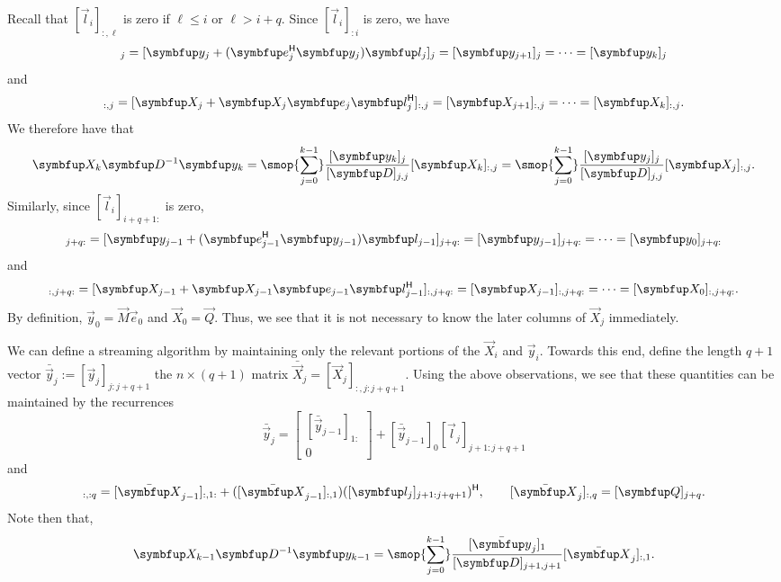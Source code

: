 Recall that $[\vec{l}_i]_{:,\ell}$ is zero if $\ell \leq i$ or $\ell > i +q$.
Since $[\vec{l}_i]_{:i}$ is zero, we have
\begin{equation*}
    [\vec{y}_j]_j
    = [\vec{y}_{j} +  (\vec{e}_{j}^\cT \vec{y}_{j}) \vec{l}_j]_j
    = [\vec{y}_{j+1}]_j
    =\cdots
    = [\vec{y}_{k}]_j
\end{equation*}
and
\begin{equation*}
    [\vec{X}_{j}]_{:,j}
    = [\vec{X}_{j} + \vec{X}_{j} \vec{e}_j \vec{l}_j^\cT]_{:,j}
    = [\vec{X}_{j+1}]_{:,j}
    = \cdots = [\vec{X}_{k}]_{:,j}.
\end{equation*}
We therefore have that
\begin{equation*}
    \vec{X}_{k} \vec{D}^{-1} \vec{y}_{k}
    = \smop{\sum_{j=0}^{k-1}} \frac{[\vec{y}_{k}]_j}{[\vec{D}]_{j,j}} [\vec{X}_{k}]_{:,j}
    = \smop{\sum_{j=0}^{k-1}} \frac{[\vec{y}_{j}]_j}{[\vec{D}]_{j,j}} [\vec{X}_{j}]_{:,j}.
\end{equation*}
Similarly, since $[\vec{l}_i]_{i+q+1:}$ is zero,
\begin{equation*}
    [\vec{y}_j]_{j+q:}
    = [\vec{y}_{j-1} + (\vec{e}_{j-1}^\cT\vec{y}_{j-1}) \vec{l}_{j-1}]_{j+q:}
    = [\vec{y}_{j-1}]_{j+q:}
    = \cdots
    = [\vec{y}_0]_{j+q:}
\end{equation*}
and
\begin{equation*}
    [\vec{X}_{j}]_{:,j+q:}
    = [\vec{X}_{j-1}+\vec{X}_{j-1}\vec{e}_{j-1}\vec{l}_{j-1}^\cT]_{:,j+q:}
    = [\vec{X}_{j-1}]_{:,j+q:}
    =\cdots
    = [\vec{X}_{0}]_{:,j+q:}.
\end{equation*}
By definition, $\vec{y}_0 = \vec{M}\vec{e}_0$ and $\vec{X}_0 = \vec{Q}$.
Thus, we see that it is not necessary to know the later columns of $\vec{X}_j$ immediately. 

We can define a streaming algorithm by maintaining only the relevant portions of the $\vec{X}_i$ and $\vec{y}_i$.
Towards this end, define the length \( q+1 \) vector \( \bar{\vec{y}}_j := [\vec{y}_j]_{j:j+q+1} \) the \( n\times (q+1) \) matrix \( \bar{\vec{X}}_j = [\vec{X}_j]_{:,j:j+q+1} \).
Using the above observations, we see that these quantities can be maintained by the recurrences
\begin{equation*}
    \bar{\vec{y}}_j =  
    \begin{bmatrix}
        [\bar{\vec{y}}_{j-1}]_{1:}\\0
    \end{bmatrix}
    +  [\bar{\vec{y}}_{j-1}]_0 [\vec{l}_j]_{j+1:j+q+1} 
\end{equation*}
and
\begin{equation*}
    [\bar{\vec{X}}_j]_{:,:q}
    = [\bar{\vec{X}}_{j-1}]_{:,1:} 
        + ( [\bar{\vec{X}}_{j-1}]_{:,1} ) ([\vec{l}_j]_{j+1:j+q+1})^\cT
    ,\qquad
    [\bar{\vec{X}}_j]_{:,q} = [\vec{Q}]_{j+q}.
\end{equation*}
Note then that,
\begin{equation*}
    \vec{X}_{k-1} \vec{D}^{-1} \vec{y}_{k-1}
    = \smop{\sum_{j=0}^{k-1}}  \frac{[\bar{\vec{y}}_j]_{1}}{[\vec{D}]_{j+1,j+1}} [\bar{\vec{X}}_j]_{:,1}.
\end{equation*}

